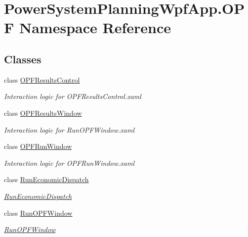 \hypertarget{namespace_power_system_planning_wpf_app_1_1_o_p_f}{}\section{Power\+System\+Planning\+Wpf\+App.\+O\+PF Namespace Reference}
\label{namespace_power_system_planning_wpf_app_1_1_o_p_f}
\subsection*{Classes}
\begin{DoxyCompactItemize}
\item 
class \hyperlink{class_power_system_planning_wpf_app_1_1_o_p_f_1_1_o_p_f_results_control}{O\+P\+F\+Results\+Control}
\begin{DoxyCompactList}\small\item\em Interaction logic for O\+P\+F\+Results\+Control.\+xaml \end{DoxyCompactList}\item 
class \hyperlink{class_power_system_planning_wpf_app_1_1_o_p_f_1_1_o_p_f_results_window}{O\+P\+F\+Results\+Window}
\begin{DoxyCompactList}\small\item\em Interaction logic for Run\+O\+P\+F\+Window.\+xaml \end{DoxyCompactList}\item 
class \hyperlink{class_power_system_planning_wpf_app_1_1_o_p_f_1_1_o_p_f_run_window}{O\+P\+F\+Run\+Window}
\begin{DoxyCompactList}\small\item\em Interaction logic for O\+P\+F\+Run\+Window.\+xaml \end{DoxyCompactList}\item 
class \hyperlink{class_power_system_planning_wpf_app_1_1_o_p_f_1_1_run_economic_dispatch}{Run\+Economic\+Dispatch}
\begin{DoxyCompactList}\small\item\em \hyperlink{class_power_system_planning_wpf_app_1_1_o_p_f_1_1_run_economic_dispatch}{Run\+Economic\+Dispatch} \end{DoxyCompactList}\item 
class \hyperlink{class_power_system_planning_wpf_app_1_1_o_p_f_1_1_run_o_p_f_window}{Run\+O\+P\+F\+Window}
\begin{DoxyCompactList}\small\item\em \hyperlink{class_power_system_planning_wpf_app_1_1_o_p_f_1_1_run_o_p_f_window}{Run\+O\+P\+F\+Window} \end{DoxyCompactList}\end{DoxyCompactItemize}
